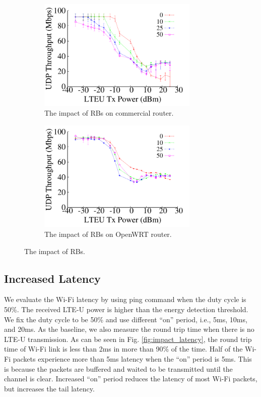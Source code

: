 \begin{figure}[t] \centering
    \begin{subfigure}[b]{\linewidth} \centering
     \includegraphics[width=3.0in, angle=0]{./figures/impact_nrbs_tplink} 
         \vspace{-0.0cm}
         \caption{The impact of RBs on commercial router.}         
        \label{impact_nrbs:a}
    \end{subfigure} %

    \begin{subfigure}[b]{\linewidth} \centering 
     \includegraphics[width=3.0in, angle=0]{./figures/impact_nrbs_openwrt}  
        \vspace{-0.0cm}
        \caption{The impact of RBs on OpenWRT router.}
        \label{impact_nrbs:b}    
    \end{subfigure} 
\caption{The impact of RBs.}
\label{impact_nrbs}
\vspace{-0.2cm}
\end{figure}





\subsection{Increased Latency}

We evaluate the Wi-Fi latency by using ping command
when the duty cycle is 50\%. 
The received LTE-U power is higher than the 
energy detection threshold. 
We fix the duty cycle to be 50\% and use different
``on'' period, i.e., 5ms, 10ms, and 20ms.
As the baseline, we also measure the round trip time
when there is no LTE-U transmission.  
As can be seen in Fig. \ref{fig:impact_latency},
the round trip time of Wi-Fi link is less
than 2ms in more than 90\% of the time.  
Half of the Wi-Fi packets experience 
more than 5ms latency when the
``on'' period is 5ms.
This is because the packets are buffered and
waited to be transmitted until the channel is
clear. 
Increased ``on'' period reduces the latency
of most Wi-Fi packets, but increases
the tail latency.  

